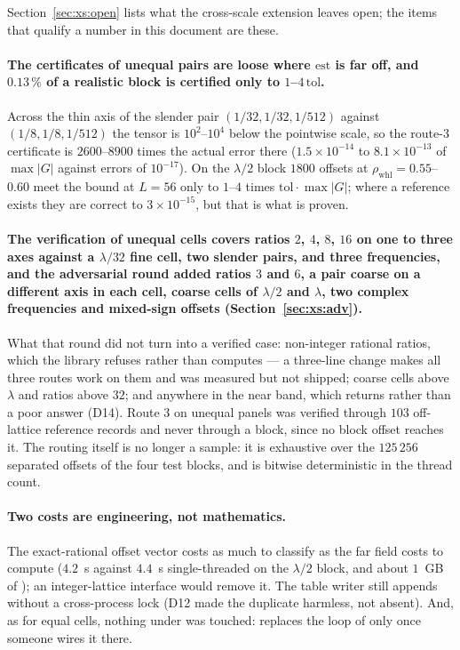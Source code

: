 Section~\ref{sec:xs:open} lists what the cross-scale extension leaves open; the items that
qualify a number in this document are these.

\paragraph{The certificates of unequal pairs are loose where $\mathrm{est}$ is far off,
and $0.13\,\%$ of a realistic block is certified only to $1$--$4\,\mathrm{tol}$.} Across
the thin axis of the slender pair $(1/32,1/32,1/512)$ against $(1/8,1/8,1/512)$ the
tensor is $10^{2}$--$10^{4}$ below the pointwise scale, so the route-3 certificate is
$2600$--$8900$ times the actual error there ($1.5\times10^{-14}$ to $8.1\times10^{-13}$ of
$\max|G|$ against errors of $10^{-17}$). On the $\lambda/2$ block $1800$ offsets at
$\rho_{\mathrm{whl}} = 0.55$--$0.60$ meet the bound at $L = 56$ only to $1$--$4$ times
$\mathrm{tol}\cdot\max|G|$; where a reference exists they are correct to
$3\times10^{-15}$, but that is what is proven.

\paragraph{The verification of unequal cells covers ratios $2$, $4$, $8$, $16$ on one to
three axes against a $\lambda/32$ fine cell, two slender pairs, and three frequencies,
and the adversarial round added ratios $3$ and $6$, a pair coarse on a different axis in
each cell, coarse cells of $\lambda/2$ and $\lambda$, two complex frequencies and
mixed-sign offsets (Section~\ref{sec:xs:adv}).} What that round did not turn into a
verified case: non-integer rational ratios, which the library refuses rather than computes
--- a three-line change makes all three routes work on them and was measured but not
shipped; coarse cells above $\lambda$ and ratios above $32$; and  anywhere in
the near band, which returns  rather than a poor answer (D14). Route 3 on unequal
panels was verified through $103$ off-lattice reference records and never through a block,
since no block offset reaches it. The routing itself is no longer a sample: it is exhaustive
over the $125\,256$ separated offsets of the four test blocks, and  is
bitwise deterministic in the thread count.

\paragraph{Two costs are engineering, not mathematics.} The exact-rational offset vector
costs as much to classify as the far field costs to compute ($4.2$~s against $4.4$~s
single-threaded on the $\lambda/2$ block, and about $1$~GB of ); an
integer-lattice interface would remove it. The table writer still appends without a
cross-process lock (D12 made the duplicate harmless, not absent). And, as for equal cells,
nothing under  was touched:  replaces the 
loop of  only once someone wires it there.

